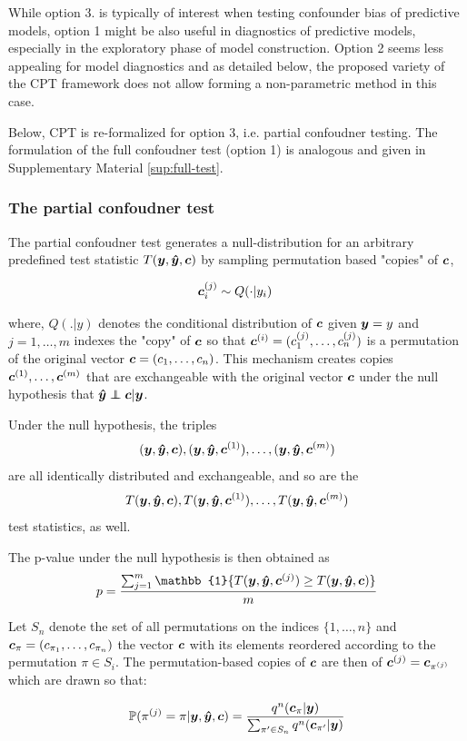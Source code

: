 \documentclass{article}
\begin{document}
While option 3. is typically of interest when testing confounder bias of predictive models, option 1 might be also useful in diagnostics of predictive models, especially in the exploratory phase of model construction. Option 2 seems less appealing for model diagnostics and as detailed below, the proposed variety of the CPT framework does not allow forming a non-parametric method in this case.

Below, CPT is re-formalized for option 3, i.e. partial confoudner testing. The formulation of the full confoudner test (option 1) is analogous and given in Supplementary Material \ref{sup:full-test}.

\subsubsection*{The partial confoudner test}

The partial confoudner test generates a null-distribution for an arbitrary predefined test statistic $T(\boldsymbol{y},\boldsymbol{\hat{y}},\boldsymbol{c})$ by sampling permutation based "copies" of $\boldsymbol{c}$,

$$\c_i^{(j)} \sim Q(\cdot|y_i) \ $$

where, $Q(.|y)$ denotes the conditional distribution of $\boldsymbol{c}$ given $\boldsymbol{y}=y$ and $j=1,\dots, m$ indexes the "copy" of $\boldsymbol{c}$ so that $\boldsymbol{c}^{(i)} = (c_1^{(j)}, \dots, c_n^{(j)})$ is a permutation of the original vector $\boldsymbol{c} = (c_1, \dots, c_n)$. This mechanism creates copies $\boldsymbol{c}^{(1)}, \dots ,\boldsymbol{c}^{(m)}$ that are exchangeable with the original vector $\boldsymbol{c}$ under the null hypothesis that $\yhat \independent \c | \y$.

Under the null hypothesis, the triples $$(\boldsymbol{y},\boldsymbol{\hat{y}},\boldsymbol{c}), (\boldsymbol{y}, \boldsymbol{\hat{y}}, \boldsymbol{c}^{(1)}),\dots, (\boldsymbol{y}, \boldsymbol{\hat{y}}, \boldsymbol{c}^{(m)})$$ are all identically distributed and exchangeable, and so are the 
$$T(\boldsymbol{y},\boldsymbol{\hat{y}},\boldsymbol{c}), T(\boldsymbol{y}, \boldsymbol{\hat{y}}, \boldsymbol{c}^{(1)}),\dots,T(\boldsymbol{y}, \boldsymbol{\hat{y}}, \boldsymbol{c}^{(m)})$$
test statistics, as well.

The p-value under the null hypothesis is then obtained as
$$ p= \frac{\sum_{j=1}^m \mathbb{1} \{T(\y, \yhat, \c^{(j)}) \geq T(\y, \yhat, \c) \}  }{m}$$

Let $S_n$ denote the set of all permutations on the indices $\{1,\dots,n\}$ and $\boldsymbol{c}_\pi = (c_{\pi_1}, \dots, c_{\pi_n})$ the vector $\boldsymbol{c}$ with its elements reordered according to the permutation $\pi \in S_i$.
The permutation-based copies of $\boldsymbol{c}$ are then of $\boldsymbol{c}^{(j)} = \boldsymbol{c}_{\pi^{(j)}}$ which are drawn so that:

\begin{equation}
    \mathbb{P}(\pi^{(j)} = \pi | \boldsymbol{y},\boldsymbol{\hat{y}},\boldsymbol{c}) = \frac{q^n(\boldsymbol{c}_\pi | \boldsymbol{y})}{\sum_{\pi' \in S_n} q^n(\boldsymbol{c}_{\pi'} | \boldsymbol{y})}
    \label{eq-pperm}
\end{equation}
\end{document}

